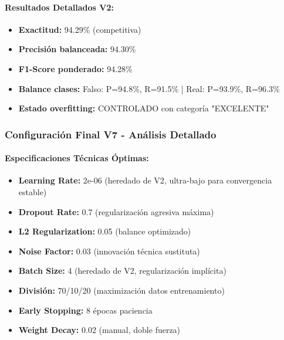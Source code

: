 \paragraph{Resultados Detallados V2:}
\begin{itemize}
    \item \textbf{Exactitud:} 94.29\% (competitiva)
    \item \textbf{Precisión balanceada:} 94.30\%
    \item \textbf{F1-Score ponderado:} 94.28\%
    \item \textbf{Balance clases:} Falso: P=94.8\%, R=91.5\% | Real: P=93.9\%, R=96.3\%
    \item \textbf{Estado overfitting:} CONTROLADO con categoría "EXCELENTE"
\end{itemize}

\subsubsection{Configuración Final V7 - Análisis Detallado}

\paragraph{Especificaciones Técnicas Óptimas:}
\begin{itemize}
    \item \textbf{Learning Rate:} 2e-06 (heredado de V2, ultra-bajo para convergencia estable)
    \item \textbf{Dropout Rate:} 0.7 (regularización agresiva máxima)
    \item \textbf{L2 Regularization:} 0.05 (balance optimizado)
    \item \textbf{Noise Factor:} 0.03 (innovación técnica sustituta)
    \item \textbf{Batch Size:} 4 (heredado de V2, regularización implícita)
    \item \textbf{División:} 70/10/20 (maximización datos entrenamiento)
    \item \textbf{Early Stopping:} 8 épocas paciencia
    \item \textbf{Weight Decay:} 0.02 (manual, doble fuerza)
\end{itemize}

